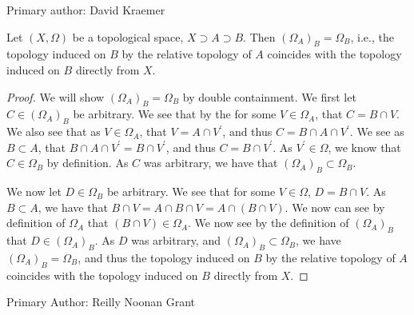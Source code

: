 Primary author: David Kraemer

\begin{majorEx}%
Let $(X, \Omega)$ be a topological space, $X \supset A \supset B$. Then $(\Omega_A)_B=\Omega_B$, i.e., the topology induced on $B$ by the relative topology of $A$ coincides with the topology induced on $B$ directly from $X$.
\end{majorEx}


\begin{proof}
  We will show $(\Omega_A)_B=\Omega_B$ by double containment. We first
  let $C \in (\Omega_A)_B$ be arbitrary. We see that by the for some
  $V \in \Omega_A$, that $C = B \cap V$. We also see that as $V \in
  \Omega_A$, that $V = A \cap  V^\prime$, and thus $C = B \cap A \cap
  V^\prime$. We see as $B\subset A$, that 
  $B \cap A \cap V^\prime=B \cap V^\prime$, and thus $C =B \cap
  V^\prime$. As $V^\prime \in \Omega$, we know that $C \in \Omega_B$
  by definition. As $C$ was arbitrary, we have that 
  $(\Omega_A)_B \subset \Omega_B$.

  We now let $D \in \Omega_B$ be arbitrary. We see that for some $V
  \in \Omega$, $D = B \cap V$. As $B\subset A$, we have that $B \cap V
  = A\cap B \cap V=A\cap (B \cap V)$. We now can see by definition of
  $\Omega_A$ that $(B \cap V) \in \Omega_A$. We now see by the
  definition of $(\Omega_A)_B$ that $D\in (\Omega_A)_B$. As $D$ was
  arbitrary, and $(\Omega_A)_B \subset \Omega_B$, we have 
  $(\Omega_A)_B = \Omega_B$, and thus the topology induced on $B$ by
  the relative topology of $A$ coincides with the topology induced on
  $B$ directly from $X$.  
\end{proof}
Primary Author: Reilly Noonan Grant

